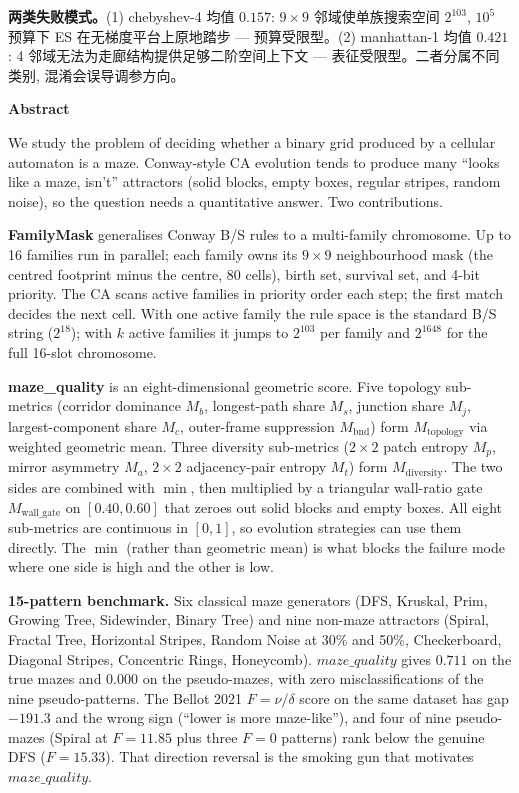 \noindent\textbf{两类失败模式。}(1) chebyshev-4 均值 $0.157$: $9 \times 9$ 邻域使单族搜索空间 $2^{103}$, $10^5$ 预算下 ES 在无梯度平台上原地踏步 --- 预算受限型。(2) manhattan-1 均值 $0.421$: 4 邻域无法为走廊结构提供足够二阶空间上下文 --- 表征受限型。二者分属不同类别, 混淆会误导调参方向。

\vspace{0.5em}
\begin{center}
{\large\bfseries\textcolor{Vermilion}{Abstract}}
\end{center}

\noindent
We study the problem of deciding whether a binary grid produced by a cellular automaton is a maze. Conway-style CA evolution tends to produce many ``looks like a maze, isn't'' attractors (solid blocks, empty boxes, regular stripes, random noise), so the question needs a quantitative answer. Two contributions.

\noindent\textbf{FamilyMask} generalises Conway B/S rules to a multi-family chromosome. Up to 16 families run in parallel; each family owns its $9{\times}9$ neighbourhood mask (the centred footprint minus the centre, 80 cells), birth set, survival set, and 4-bit priority. The CA scans active families in priority order each step; the first match decides the next cell. With one active family the rule space is the standard B/S string ($2^{18}$); with $k$ active families it jumps to $2^{103}$ per family and $2^{1648}$ for the full 16-slot chromosome.

\noindent\textbf{maze\_quality} is an eight-dimensional geometric score. Five topology sub-metrics (corridor dominance $M_b$, longest-path share $M_s$, junction share $M_j$, largest-component share $M_c$, outer-frame suppression $M_{\text{bnd}}$) form $M_{\text{topology}}$ via weighted geometric mean. Three diversity sub-metrics ($2{\times}2$ patch entropy $M_p$, mirror asymmetry $M_a$, $2{\times}2$ adjacency-pair entropy $M_t$) form $M_{\text{diversity}}$. The two sides are combined with $\min$, then multiplied by a triangular wall-ratio gate $M_{\text{wall\_gate}}$ on $[0.40, 0.60]$ that zeroes out solid blocks and empty boxes. All eight sub-metrics are continuous in $[0,1]$, so evolution strategies can use them directly. The $\min$ (rather than geometric mean) is what blocks the failure mode where one side is high and the other is low.

\noindent\textbf{15-pattern benchmark.} Six classical maze generators (DFS, Kruskal, Prim, Growing Tree, Sidewinder, Binary Tree) and nine non-maze attractors (Spiral, Fractal Tree, Horizontal Stripes, Random Noise at 30\% and 50\%, Checkerboard, Diagonal Stripes, Concentric Rings, Honeycomb). $maze\_quality$ gives $0.711$ on the true mazes and $0.000$ on the pseudo-mazes, with zero misclassifications of the nine pseudo-patterns. The Bellot 2021 $F = \nu/\delta$ score on the same dataset has gap $-191.3$ and the wrong sign (``lower is more maze-like''), and four of nine pseudo-mazes (Spiral at $F{=}11.85$ plus three $F{=}0$ patterns) rank below the genuine DFS ($F{=}15.33$). That direction reversal is the smoking gun that motivates $maze\_quality$.

